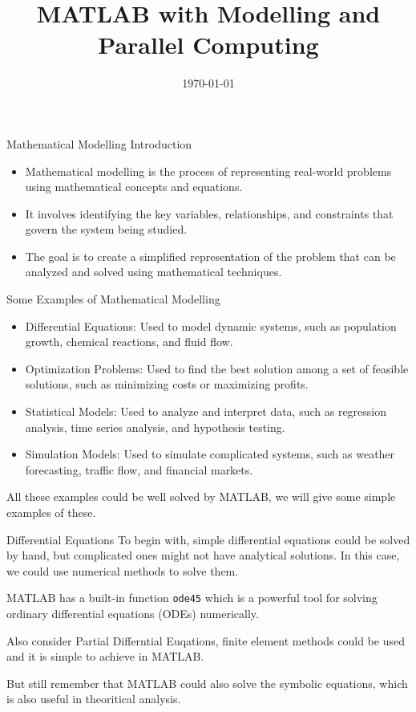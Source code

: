 \documentclass[aspectratio=169]{beamer}
\title{MATLAB with Modelling and Parallel Computing}
\subtitle{}
\date{\today}
\institute{\small \emph{Ocean University of China, High Performance Computing Club, Qingdao 266100}}
\begin{document}
    \begin{frame}
        \titlepage
    \end{frame}

    \begin{frame}{Mathematical Modelling Introduction}
        \begin{itemize}
            \item Mathematical modelling is the process of representing real-world problems using mathematical concepts and equations.
            \item It involves identifying the key variables, relationships, and constraints that govern the system being studied.
            \item The goal is to create a simplified representation of the problem that can be analyzed and solved using mathematical techniques.
        \end{itemize}
    \end{frame}

    \begin{frame}{Some Examples of Mathematical Modelling}
        \begin{itemize}
            \item Differential Equations: Used to model dynamic systems, such as population growth, chemical reactions, and fluid flow.
            \item Optimization Problems: Used to find the best solution among a set of feasible solutions, such as minimizing costs or maximizing profits.
            \item Statistical Models: Used to analyze and interpret data, such as regression analysis, time series analysis, and hypothesis testing.
            \item Simulation Models: Used to simulate complicated systems, such as weather forecasting, traffic flow, and financial markets.
        \end{itemize}
        All these examples could be well solved by MATLAB, we will give some simple examples of these.
    \end{frame}

    \begin{frame}{Differential Equations}
        To begin with, simple differential equations could be solved by hand, but complicated ones might not have analytical solutions. In this case, we could use numerical methods to solve them. \par
        MATLAB has a built-in function \texttt{ode45} which is a powerful tool for solving ordinary differential equations (ODEs) numerically.\par
        Also consider Partial Differntial Euqations, finite element methods could be used and it is simple to achieve in MATLAB. \par
        But still remember that MATLAB could also solve the symbolic equations, which is also useful in theoritical analysis.\par
    \end{frame}
\end{document}
